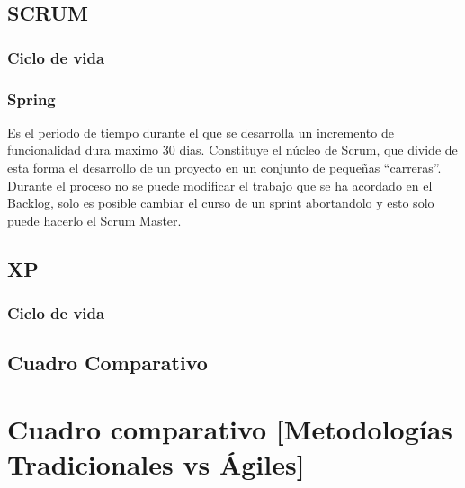 \subsection{SCRUM}
\subsubsection{Ciclo de vida}


\subsubsection{Spring}
\setlength{\parskip}{5mm}

	Es el periodo de tiempo durante el que se desarrolla un incremento de funcionalidad dura maximo 30 dias. Constituye el núcleo de Scrum, que divide de esta forma el desarrollo de un proyecto en un conjunto de pequeñas “carreras”. Durante el proceso no se puede modificar el trabajo que se ha acordado en el Backlog, solo es posible cambiar el curso de un sprint abortandolo y esto solo puede hacerlo el Scrum Master. 
	
\setlength{\parskip}{0mm}

\subsubsection{}
    

\subsection{XP}
\subsubsection{Ciclo de vida}
\subsection{}
\subsection{Cuadro Comparativo}

\section{Cuadro comparativo [Metodologías Tradicionales vs Ágiles]} 

